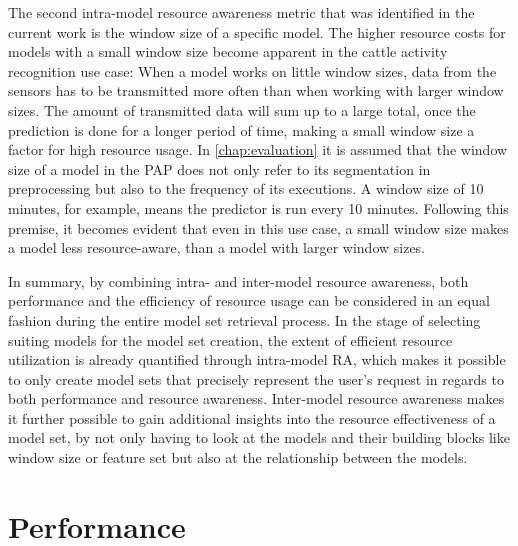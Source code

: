 The second intra-model resource awareness metric that was identified in the current work is the window size of a specific model. The higher resource costs for models with a small window size become apparent in the cattle activity recognition use case: When a model works on little window sizes, data from the sensors has to be transmitted more often than when working with larger window sizes. The amount of transmitted data will sum up to a large total, once the prediction is done for a longer period of time, making a small window size a factor for high resource usage. In \autoref{chap:evaluation} it is assumed that the window size of a model in the PAP does not only refer to its segmentation in preprocessing but also to the frequency of its executions. A window size of 10 minutes, for example, means the predictor is run every 10 minutes. Following this premise, it becomes evident that even in this use case, a small window size makes a model less resource-aware, than a model with larger window sizes. 

In summary, by combining intra- and inter-model resource awareness, both performance and the efficiency of resource usage can be considered in an equal fashion during the entire model set retrieval process. In the stage of selecting suiting models for the model set creation, the extent of efficient resource utilization is already quantified through intra-model RA, which makes it possible to only create model sets that precisely represent the user's request in regards to both performance and resource awareness. Inter-model resource awareness makes it further possible to gain additional insights into the resource effectiveness of a model set, by not only having to look at the models and their building blocks like window size or feature set but also at the relationship between the models.



\section{Performance} \label{performance}

